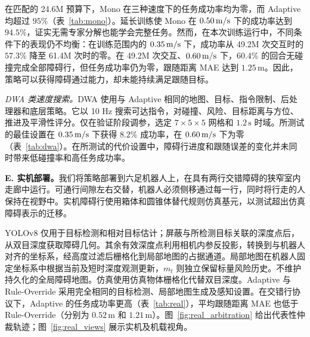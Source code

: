 在匹配的 24.6M 预算下，Mono 在三种速度下的任务成功率均为零，而 Adaptive 均超过 $95\%$（表~\ref{tab:mono}）。延长训练使 Mono 在 $0.50\,\mathrm{m/s}$ 下的成功率达到 $94.5\%$，证实无需专家分解也能学会完整任务。然而，在本次训练运行中，不同条件下的表现仍不均衡：在训练范围内的 $0.35\,\mathrm{m/s}$ 下，成功率从 49.2M 次交互时的 $57.3\%$ 降至 61.4M 次时的零。在 49.2M 次交互、$0.60\,\mathrm{m/s}$ 下，$60.4\%$ 的回合无碰撞完成全部障碍行，但任务成功率仍为零，跟随距离 MAE 达到 $1.25\,\mathrm{m}$。因此，策略可以获得障碍通过能力，却未能持续满足跟随目标。



\emph{DWA 类速度搜索。}DWA 使用与 Adaptive 相同的地图、目标、指令限制、后处理器和底层策略。它以 10 Hz 搜索可达指令，对碰撞、风险、目标距离与方位、推进及平滑性评分。仅在验证阶段调参，选定 $7\times5\times5$ 网格和 $1.2\,\mathrm{s}$ 时域。所测试的最佳设置在 $0.35\,\mathrm{m/s}$ 下获得 $8.2\%$ 成功率，在 $0.60\,\mathrm{m/s}$ 下为零（表~\ref{tab:dwa}）。在所测试的代价设置中，障碍行进度和跟随误差的变化并未同时带来低碰撞率和高任务成功率。


\textbf{E. 实机部署。}我们将策略部署到六足机器人上，在具有两行交错障碍的狭窄室内走廊中运行。可通行间隙左右交替，机器人必须侧移通过每一行，同时将行走的人保持在视野中。实机障碍行使用箱体和圆锥体替代规则仿真基元，以测试超出仿真障碍表示的迁移。

YOLOv8 仅用于目标检测和相对目标估计；屏蔽与所检测目标关联的深度点后，从双目深度获取障碍几何。其余有效深度点利用相机内参反投影，转换到与机器人对齐的坐标系，经高度过滤后栅格化到局部地图的占据通道。局部地图在机器人固定坐标系中根据当前及短时深度观测更新，$m_t$ 则独立保留标量风险历史。不维护持久化的全局障碍地图。仿真使用仿真物体栅格化代替双目深度。Adaptive 与 Rule-Override 采用完全相同的目标检测、局部地图生成及感知设置。在交错行协议下，Adaptive 的任务成功率更高（表~\ref{tab:real}），平均跟随距离 MAE 也低于 Rule-Override（分别为 $0.52\,\mathrm{m}$ 和 $1.21\,\mathrm{m}$）。图~\ref{fig:real_arbitration} 给出代表性仲裁轨迹；图~\ref{fig:real_views} 展示实机及机载视角。

